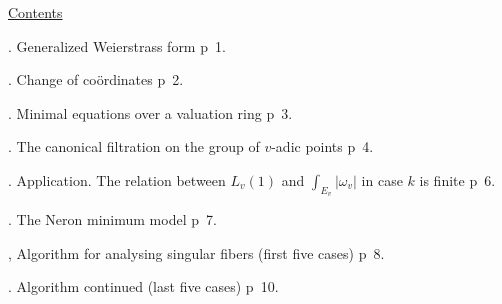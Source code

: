 \begin{center}\uline{Contents}\end{center}

. Generalized Weierstrass form \qquad p~1.

. Change of coördinates \qquad p~2.

. Minimal  equations over a valuation ring \qquad p~3.

. The canonical filtration on the group of $v$-adic points \qquad p~4.

. Application. The relation between $L_v(1)$ and $\int_{E_v}|\omega_v|$ in case $k$ is finite \qquad p~6.

. The Neron minimum model \qquad p~7.

, Algorithm for analysing singular fibers \quad (first five cases) \qquad p~8.

. Algorithm continued \quad (last five cases) \qquad p~10.

